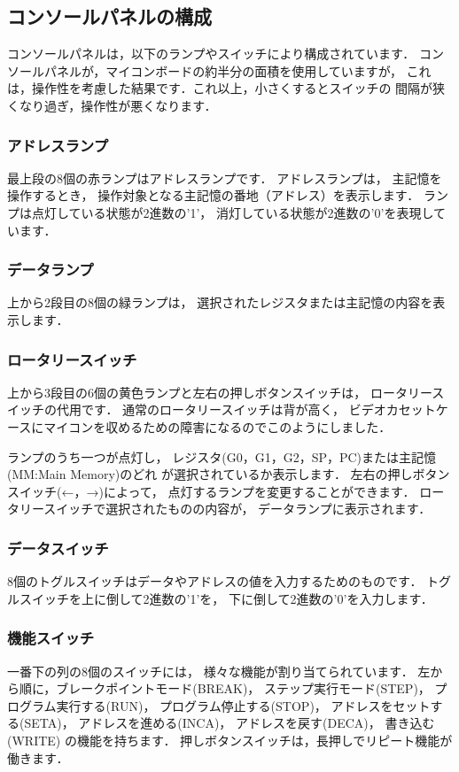 
\subsection{コンソールパネルの構成}
コンソールパネルは，以下のランプやスイッチにより構成されています．
コンソールパネルが，マイコンボードの約半分の面積を使用していますが，
これは，操作性を考慮した結果です．これ以上，小さくするとスイッチの
間隔が狭くなり過ぎ，操作性が悪くなります．

\subsubsection{アドレスランプ}
最上段の8個の赤ランプはアドレスランプです．
アドレスランプは，
主記憶を操作するとき，
操作対象となる主記憶の番地（アドレス）を表示します．
ランプは点灯している状態が2進数の'1'，
消灯している状態が2進数の'0'を表現しています．

\subsubsection{データランプ}
上から2段目の8個の緑ランプは，
選択されたレジスタまたは主記憶の内容を表示します．

\subsubsection{ロータリースイッチ}
上から3段目の6個の黄色ランプと左右の押しボタンスイッチは，
ロータリースイッチの代用です．
通常のロータリースイッチは背が高く，
ビデオカセットケースにマイコンを収めるための障害になるのでこのようにしました．

ランプのうち一つが点灯し，
レジスタ(G0，G1，G2，SP，PC)または主記憶(MM:Main Memory)のどれ
が選択されているか表示します．
左右の押しボタンスイッチ(←，→)によって，
点灯するランプを変更することができます．
ロータリースイッチで選択されたものの内容が，
データランプに表示されます．

\subsubsection{データスイッチ}
8個のトグルスイッチはデータやアドレスの値を入力するためのものです．
トグルスイッチを上に倒して2進数の'1'を，
下に倒して2進数の'0'を入力します．

\subsubsection{機能スイッチ}
一番下の列の8個のスイッチには，
様々な機能が割り当てられています．
左から順に，ブレークポイントモード(BREAK)，
ステップ実行モード(STEP)，
プログラム実行する(RUN)，
プログラム停止する(STOP)，
アドレスをセットする(SETA)，
アドレスを進める(INCA)，
アドレスを戻す(DECA)，
書き込む(WRITE)
の機能を持ちます．
押しボタンスイッチは，長押しでリピート機能が働きます．

